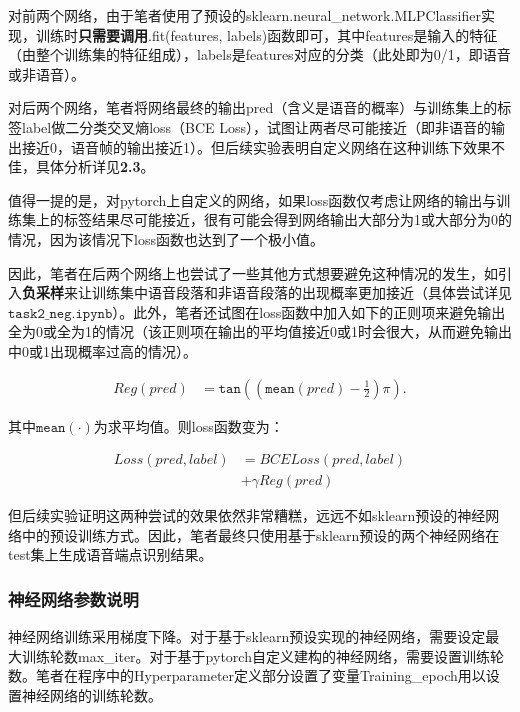 \documentclass[a4paper]{article}
\begin{document}
    对前两个网络，由于笔者使用了预设的sklearn.neural\_network.MLPClassifier实现，训练时\textbf{只需要调用}.fit(features, labels)函数即可，其中features是输入的特征（由整个训练集的特征组成），labels是features对应的分类（此处即为0/1，即语音或非语音）。
    
    对后两个网络，笔者将网络最终的输出pred（含义是语音的概率）与训练集上的标签label做二分类交叉熵loss（BCE Loss），试图让两者尽可能接近（即非语音的输出接近0，语音帧的输出接近1）。但后续实验表明自定义网络在这种训练下效果不佳，具体分析详见\textbf{2.3}。
    
    值得一提的是，对pytorch上自定义的网络，如果loss函数仅考虑让网络的输出与训练集上的标签结果尽可能接近，很有可能会得到网络输出大部分为1或大部分为0的情况，因为该情况下loss函数也达到了一个极小值。
    
    因此，笔者在后两个网络上也尝试了一些其他方式想要避免这种情况的发生，如引入\textbf{负采样}来让训练集中语音段落和非语音段落的出现概率更加接近（具体尝试详见$\mathtt{task2\_neg.ipynb}$）。此外，笔者还试图在loss函数中加入如下的正则项来避免输出全为0或全为1的情况（该正则项在输出的平均值接近0或1时会很大，从而避免输出中0或1出现概率过高的情况）。
    
    \vspace{-1em}
    \begin{align*}
        Reg(pred) &= \mathtt{tan}\left(\left(\mathtt{mean}(pred)-\frac{1}{2}\right)\pi\right). 
    \end{align*}
    
    其中$\mathtt{mean}(\cdot)$为求平均值。则loss函数变为：
    
    \vspace{-1em}
    \begin{align*}
        Loss(pred,label) &= BCELoss(pred,label) \\
        &+ \gamma Reg(pred)
    \end{align*}
        
    但后续实验证明这两种尝试的效果依然非常糟糕，远远不如sklearn预设的神经网络中的预设训练方式。因此，笔者最终只使用基于sklearn预设的两个神经网络在test集上生成语音端点识别结果。
    
    \subsubsection{神经网络参数说明}
    
    神经网络训练采用梯度下降。对于基于sklearn预设实现的神经网络，需要设定最大训练轮数max\_iter。对于基于pytorch自定义建构的神经网络，需要设置训练轮数。笔者在程序中的Hyperparameter定义部分设置了变量Training\_epoch用以设置神经网络的训练轮数。
    
\end{document}
